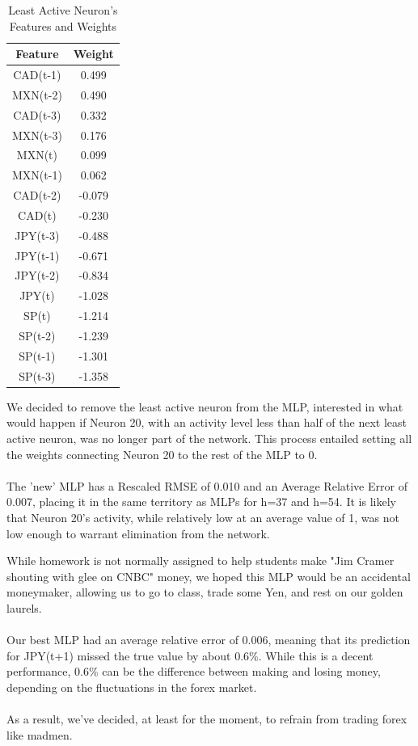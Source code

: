 \documentclass{homework}
\begin{document}
\begin{table}[H]
    \centering
    \begin{tabular}{c|c}
         Feature&Weight \\\hline
        CAD(t-1)&0.499\\
        MXN(t-2)&0.490\\
        CAD(t-3)&0.332\\
        MXN(t-3)&0.176\\
        MXN(t)&0.099\\
        MXN(t-1)&0.062\\
        CAD(t-2)&-0.079\\
        CAD(t)&-0.230\\
        JPY(t-3)&-0.488\\
        JPY(t-1)&-0.671\\
        JPY(t-2)&-0.834\\
        JPY(t)&-1.028\\
        SP(t)&-1.214\\
        SP(t-2)&-1.239\\
        SP(t-1)&-1.301\\
        SP(t-3)&-1.358
    \end{tabular}
    \caption{Least Active Neuron's Features and Weights}
    \label{least_active}
\end{table} 

We decided to remove the least active neuron from the MLP, interested in what would happen if Neuron 20, with an activity level less than half of the next least active neuron, was no longer part of the network. This process entailed setting all the weights connecting Neuron 20 to the rest of the MLP to 0.\\\\
The 'new' MLP has a Rescaled RMSE of 0.010 and an Average Relative Error of 0.007, placing it in the same territory as MLPs for h=37 and h=54. It is likely that Neuron 20's activity, while relatively low at an average value of 1, was not low enough to warrant elimination from the network.

While homework is not normally assigned to help students make "Jim Cramer shouting with glee on CNBC" money, we hoped this MLP would be an accidental moneymaker, allowing us to go to class, trade some Yen, and rest on our golden laurels.\\\\
Our best MLP had an average relative error of 0.006, meaning that its prediction for JPY(t+1) missed the true value by about 0.6\%. While this is a decent performance, 0.6\% can be the difference between making and losing money, depending on the fluctuations in the forex market.\\\\
As a result, we've decided, at least for the moment, to refrain from trading forex like madmen.
\newpage

\end{document}
